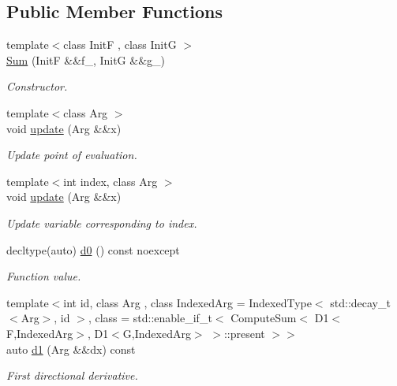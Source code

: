 \subsection*{Public Member Functions}
\begin{DoxyCompactItemize}
\item 
{\footnotesize template$<$class InitF , class InitG $>$ }\\\hyperlink{structFunG_1_1MathematicalOperations_1_1Sum_a7b04c111c5f6f2bafda3684f262d146e}{Sum} (InitF \&\&f\+\_\+, InitG \&\&g\+\_\+)
\begin{DoxyCompactList}\small\item\em Constructor. \end{DoxyCompactList}\item 
{\footnotesize template$<$class Arg $>$ }\\void \hyperlink{structFunG_1_1MathematicalOperations_1_1Sum_a15985be13a1838d868d2adce8e4f5402}{update} (Arg \&\&x)
\begin{DoxyCompactList}\small\item\em Update point of evaluation. \end{DoxyCompactList}\item 
{\footnotesize template$<$int index, class Arg $>$ }\\void \hyperlink{structFunG_1_1MathematicalOperations_1_1Sum_a4e10622e11a29d739f0d4db364980f9a}{update} (Arg \&\&x)
\begin{DoxyCompactList}\small\item\em Update variable corresponding to index. \end{DoxyCompactList}\item 
decltype(auto) \hyperlink{structFunG_1_1MathematicalOperations_1_1Sum_ac95658b8dae3f165fe612f056daecb30}{d0} () const noexcept
\begin{DoxyCompactList}\small\item\em Function value. \end{DoxyCompactList}\item 
{\footnotesize template$<$int id, class Arg , class Indexed\+Arg  = Indexed\+Type$<$ std\+::decay\+\_\+t$<$\+Arg$>$, id $>$, class  = std\+::enable\+\_\+if\+\_\+t$<$ Compute\+Sum$<$ D1$<$\+F,\+Indexed\+Arg$>$, D1$<$\+G,\+Indexed\+Arg$>$ $>$\+::present $>$$>$ }\\auto \hyperlink{structFunG_1_1MathematicalOperations_1_1Sum_aee8c204769ab30f5ae68f9a8b0fa9bf8}{d1} (Arg \&\&dx) const 
\begin{DoxyCompactList}\small\item\em First directional derivative. \end{DoxyCompactList}\item 

\end{DoxyCompactItemize}
